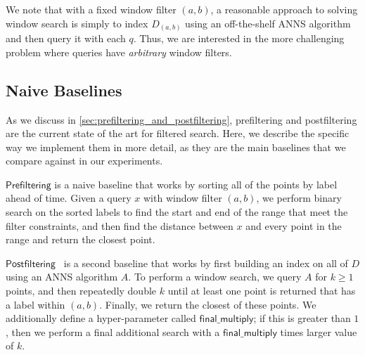 \documentclass{article}
\theoremstyle{plain}
\theoremstyle{definition}
\theoremstyle{remark}
\newcommand{\algname}[1]{\ensuremath{\mathsf{#1}}}
\begin{document}
We note that with a fixed window filter $(a, b)$, a reasonable approach to solving window search is simply to index $D_{(a, b)}$ using an off-the-shelf ANNS algorithm and then query it with each $q$. Thus, we are interested in the more challenging problem where queries have \textit{arbitrary} window filters.

\subsection{Naive Baselines}
\label{sec:naive_baslines}

As we discuss in \cref{sec:prefiltering_and_postfiltering}, prefiltering and postfiltering are the current state of the art for filtered search. Here, we describe the specific way we implement them in more detail, as they are the main baselines that we compare against in our experiments.

\algname{Prefiltering} is a naive baseline that works by sorting all of the points by label ahead of time. Given a query $x$ with window filter $(a, b)$, we perform binary search on the sorted labels to find the start and end of the range that meet the filter constraints, and then find the distance between $x$ and every point in the range and return the closest point.

\algname{Postfiltering}~\cite{yu2023pecann,chen2020fast} is a second baseline that works by first building an index on all of $D$ using an ANNS algorithm $A$. To perform a window search, we query $A$ for $k \ge 1$ points, and then repeatedly double $k$ until at least one point is returned that has a label within $(a, b)$. Finally, we return the closest of these points. We additionally define a hyper-parameter called $\mathsf{final\_multiply}$; if this is greater than $1$, then we perform a final additional search with a $\mathsf{final\_multiply}$ times larger value of $k$.
\end{document}
